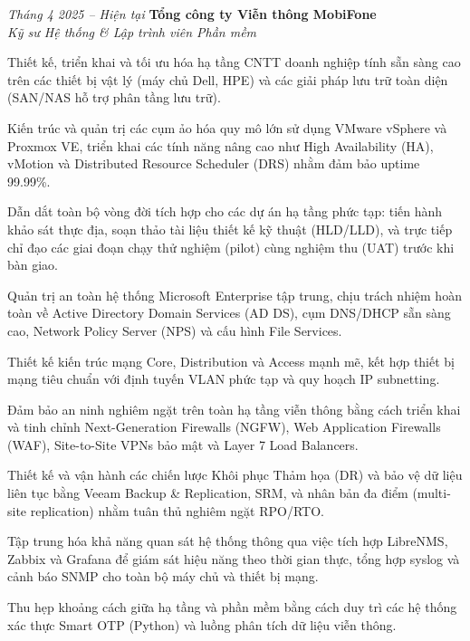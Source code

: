 \begin{twocolentry}{\textit{Tháng 4 2025 -- Hiện tại}}
    \textbf{Tổng công ty Viễn thông MobiFone} \\[4pt]
    \textit{Kỹ sư Hệ thống \& Lập trình viên Phần mềm}
\end{twocolentry}
\begin{onecolentry}
    \begin{highlights}
        \item Thiết kế, triển khai và tối ưu hóa hạ tầng CNTT doanh nghiệp tính sẵn sàng cao trên các thiết bị vật lý (máy chủ Dell, HPE) và các giải pháp lưu trữ toàn diện (SAN/NAS hỗ trợ phân tầng lưu trữ).
        \item Kiến trúc và quản trị các cụm ảo hóa quy mô lớn sử dụng VMware vSphere và Proxmox VE, triển khai các tính năng nâng cao như High Availability (HA), vMotion và Distributed Resource Scheduler (DRS) nhằm đảm bảo uptime 99.99\%.
        \item Dẫn dắt toàn bộ vòng đời tích hợp cho các dự án hạ tầng phức tạp: tiến hành khảo sát thực địa, soạn thảo tài liệu thiết kế kỹ thuật (HLD/LLD), và trực tiếp chỉ đạo các giai đoạn chạy thử nghiệm (pilot) cùng nghiệm thu (UAT) trước khi bàn giao.
        \item Quản trị an toàn hệ thống Microsoft Enterprise tập trung, chịu trách nhiệm hoàn toàn về Active Directory Domain Services (AD DS), cụm DNS/DHCP sẵn sàng cao, Network Policy Server (NPS) và cấu hình File Services.
        \item Thiết kế kiến trúc mạng Core, Distribution và Access mạnh mẽ, kết hợp thiết bị mạng tiêu chuẩn với định tuyến VLAN phức tạp và quy hoạch IP subnetting.
        \item Đảm bảo an ninh nghiêm ngặt trên toàn hạ tầng viễn thông bằng cách triển khai và tinh chỉnh Next-Generation Firewalls (NGFW), Web Application Firewalls (WAF), Site-to-Site VPNs bảo mật và Layer 7 Load Balancers.
        \item Thiết kế và vận hành các chiến lược Khôi phục Thảm họa (DR) và bảo vệ dữ liệu liên tục bằng Veeam Backup \& Replication, SRM, và nhân bản đa điểm (multi-site replication) nhằm tuân thủ nghiêm ngặt RPO/RTO.
        \item Tập trung hóa khả năng quan sát hệ thống thông qua việc tích hợp LibreNMS, Zabbix và Grafana để giám sát hiệu năng theo thời gian thực, tổng hợp syslog và cảnh báo SNMP cho toàn bộ máy chủ và thiết bị mạng.
        \item Thu hẹp khoảng cách giữa hạ tầng và phần mềm bằng cách duy trì các hệ thống xác thực Smart OTP (Python) và luồng phân tích dữ liệu viễn thông.
    \end{highlights}
\end{onecolentry}
\vspace{0.2 cm}

